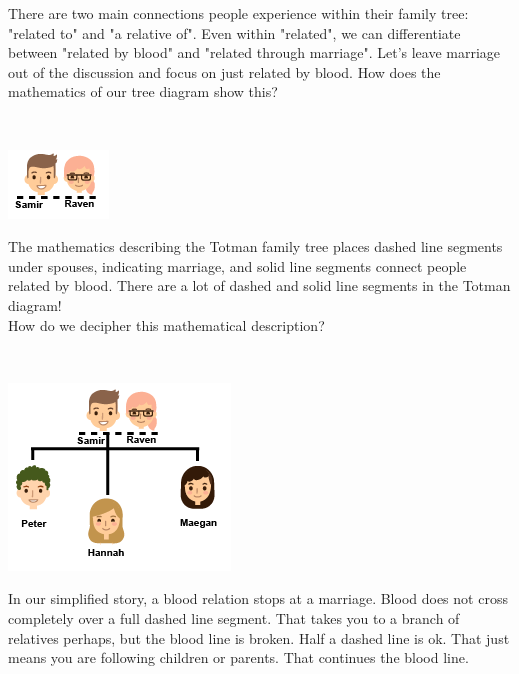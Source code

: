 \documentclass{ximera}
\begin{document}
There are two main connections people experience within their family tree: "related to" and "a relative of". Even within "related", we can differentiate between "related by blood" and "related through marriage". Let's leave marriage out of the discussion and focus on just related by blood.  How does the mathematics of our tree diagram show this?



\begin{notation}
\quad \\

\begin{image}
\includegraphics{pics/Samir_Raven.png}
\end{image}

The mathematics describing the Totman family tree places dashed line segments under spouses, indicating marriage, and solid line segments connect people related by blood. There are a lot of dashed and solid line segments in the Totman diagram!  \\

How do we decipher this mathematical description?

\end{notation}





\begin{notation}
\quad \\

\begin{image}
\includegraphics{pics/Samir_Raven_children.png}
\end{image}

In our simplified story, a blood relation stops at a marriage.  Blood does not cross completely over a full dashed line segment. That takes you to a branch of relatives perhaps, but the blood line is broken.  Half a dashed line is ok.  That just means you are following children or parents.  That continues the blood line.

\end{notation}
\end{document}
